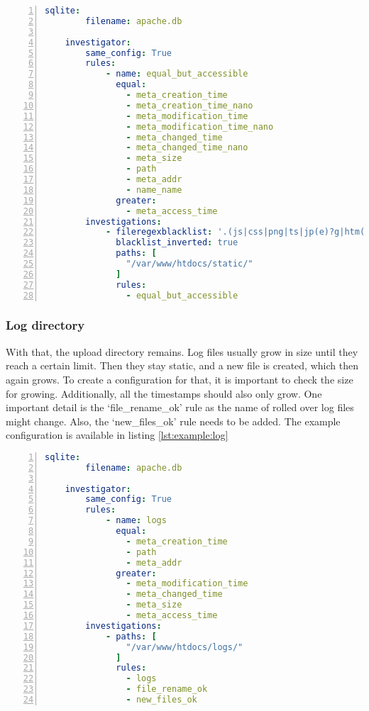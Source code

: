 \begin{lstlisting}[language=yaml, numbers=left, caption=Example Static Files Configuration, label=lst:example:static]
    sqlite:
        filename: apache.db
    
    investigator:
        same_config: True
        rules: 
            - name: equal_but_accessible
              equal:
                - meta_creation_time
                - meta_creation_time_nano
                - meta_modification_time
                - meta_modification_time_nano
                - meta_changed_time
                - meta_changed_time_nano
                - meta_size
                - path
                - meta_addr
                - name_name
              greater:
                - meta_access_time
        investigations:
            - fileregexblacklist: '.(js|css|png|ts|jp(e)?g|htm(l)?)$'
              blacklist_inverted: true
              paths: [
                "/var/www/htdocs/static/"
              ]
              rules:
                - equal_but_accessible

\end{lstlisting}

\subsubsection{Log directory}

With that, the upload directory remains. Log files usually grow in size until they reach a certain limit. Then they stay static, and a new file is created, which then again grows. To create a configuration for that, it is important to check the size for growing. Additionally, all the timestamps should also only grow. One important detail is the `file\_rename\_ok' rule as the name of rolled over log files might change. Also, the `new\_files\_ok' rule needs to be added. The example configuration is available in listing \ref{lst:example:log}

\begin{lstlisting}[language=yaml, numbers=left, caption=Example Log Directory Configuration, label=lst:example:log]
    sqlite:
        filename: apache.db
    
    investigator:
        same_config: True
        rules: 
            - name: logs
              equal:
                - meta_creation_time
                - path
                - meta_addr
              greater:
                - meta_modification_time
                - meta_changed_time
                - meta_size
                - meta_access_time
        investigations:
            - paths: [
                "/var/www/htdocs/logs/"
              ]
              rules:
                - logs
                - file_rename_ok
                - new_files_ok

\end{lstlisting}

